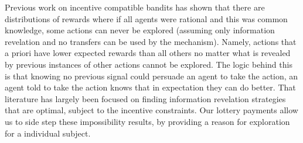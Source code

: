 Previous work on incentive compatible bandits \cite{kremer2014implementing,mansour2015bayesian} has shown that there are distributions of rewards where if all agents were rational and this was common knowledge, some actions can never be explored (assuming only information revelation and no transfers can be used by the mechanism). 
Namely, actions that a priori have lower expected rewards than all others no matter what is revealed by previous instances of other actions cannot be explored.
The logic behind this is that knowing no previous signal could persuade an agent to take the action, an agent told to take the action knows that in expectation they can do better.
That literature has largely been focused on finding information revelation strategies that are optimal, subject to the incentive constraints. 
Our lottery payments allow us to side step these impossibility results, by providing a reason for exploration for a individual subject. 





